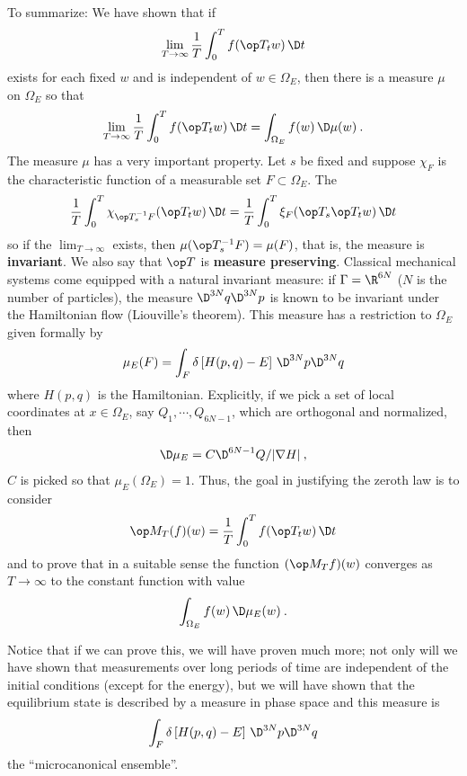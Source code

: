 To summarize: We have shown that if
\begin{align}
    \lim_{T \rightarrow \infty} \frac{1}{T} \int_0^T f(\op T_t w) \, \D t
\end{align}
exists for each fixed $w$ and is independent of $w \in \Omega_E$, then there is a measure $\mu$ on $\Omega_E$ so that
\begin{align}
    \lim_{T \rightarrow \infty} \frac{1}{T} \int_0^T f(\op T_t w) \, \D t = \int_{\Omega_E} f(w) \, \D \mu(w) \:.
\end{align}
The measure $\mu$ has a very important property. Let $s$ be fixed and suppose $\chi_F$ is the characteristic function of a measurable set $F \subset \Omega_E$. The \begin{align}
    \frac{1}{T} \int_0^T \chi_{\op T_s^{-1} F} (\op T_t w) \, \D t = \frac{1}{T} \int_0^T \xi_F (\op T_s \op T_t w) \, \D t
\end{align}
so if the $\lim_{T \rightarrow \infty}$ exists, then $\mu(\op T_s^{-1}F) = \mu(F)$, that is, the measure is \textbf{invariant}. We also say that $\op T$ is \textbf{measure preserving}. Classical mechanical systems come equipped with a natural invariant measure: if $\Gamma = \R^{6N}$ ($N$ is the number of particles), the measure $\D^{3N} q \D^{3N} p$ is known to be invariant under the Hamiltonian flow (Liouville’s theorem). This measure has a restriction to $\Omega_E$ given formally by
\begin{align}
    \mu_E(F) = \int_F \delta \left[ H(p,q) - E \right] \, \D^{3N} p \D^{3N} q
\end{align}
where $H(p,q)$ is the Hamiltonian.
Explicitly, if we pick a set of local coordinates at $x \in \Omega_E$, say $Q_1, \cdots, Q_{6N-1}$, which are orthogonal and normalized, then
\begin{align}
    \D \mu_E = C \D^{6N-1} Q/ |\nabla H| \:,
\end{align}
$C$ is picked so that $\mu_E(\Omega_E) = 1$. Thus, the goal in justifying the zeroth law is to consider \begin{align}
    \op M_T(f)(w) = \frac{1}{T} \int_0^T f(\op T_t w) \, \D t
\end{align}
and to prove that in a suitable sense the function $(\op M_T f)(w)$ converges as $T \rightarrow \infty$ to the constant function with value
\begin{align}
    \int_{\Omega_E} f(w) \, \D \mu_E(w) \:.
\end{align}

Notice that if we can prove this, we will have proven much more; not only will we have shown that measurements over long periods of time are independent of the initial conditions (except for the energy), but we will have shown that the equilibrium state is described by a measure in phase space and this measure is
\begin{align}
    \int_F \delta \left[ H(p,q) - E \right] \, \D^{3N} p \D^{3N} q
\end{align}
the \enquote{microcanonical ensemble}.

